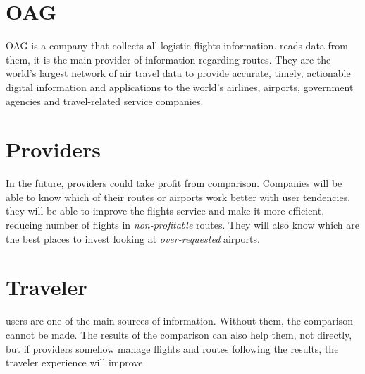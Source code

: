 \section{OAG}

OAG is a company that collects all logistic flights information. \squad reads data from them, it is the main provider of information regarding routes. They are the world's largest network of air travel data to provide accurate, timely, actionable digital information and applications to the world's airlines, airports, government agencies and travel-related service companies\cite{oag}.

\section{Providers}

In the future, providers could take profit from \thesistitle comparison. Companies will be able to know which of their routes or airports work better with user tendencies, they will be able to improve the flights service and make it more efficient, reducing number of flights in \textit{non-profitable} routes. They will also know which are the best places to invest looking at \textit{over-requested} airports.

\section{Traveler}

\company users are one of the main sources of information. Without them, the comparison cannot be made. The results of the comparison can also help them, not directly, but if providers somehow manage flights and routes following the \thesistitle results, the traveler experience will improve.


